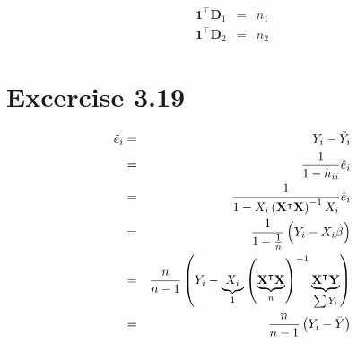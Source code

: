 \documentclass{article}
\begin{document}
\begin{eqnarray*}
\mathbf{1}^{\intercal }\mathbf{D}_{1} &=&n_{1} \\
\mathbf{1}^{\intercal }\mathbf{D}_{2} &=&n_{2}
\end{eqnarray*}

\section*{Excercise 3.19}

\begin{eqnarray*}
\tilde{e}_{i} &=&Y_{i}-\tilde{Y}_{i} \\
&=&\frac{1}{1-h_{ii}}\hat{e}_{i} \\
&=&\frac{1}{1-X_{i}\left( \mathbf{X}^{\intercal }\mathbf{X}\right) ^{-1}X_{i}%
}\hat{e}_{i} \\
&=&\frac{1}{1-\frac{1}{n}}\left( Y_{i}-X_{i}\hat{\beta}\right) \\
&=&\frac{n}{n-1}\left( Y_{i}-\underset{1}{\underbrace{X_{i}}}\left( \underset%
{n}{\underbrace{\mathbf{X}^{\intercal }\mathbf{X}}}\right) ^{-1}\underset{%
\sum Y_{i}}{\underbrace{\mathbf{X}^{\intercal }\mathbf{Y}}}\right) \\
&=&\frac{n}{n-1}\left( Y_{i}-\bar{Y}\right)
\end{eqnarray*}
\end{document}
